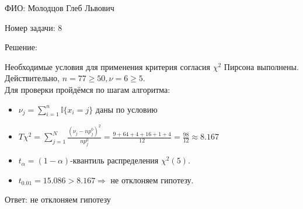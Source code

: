 \documentclass[14pt]{extarticle}
\begin{document}
ФИО: Молодцов Глеб Львович

\vspace{10pt}

Номер задачи: 8

\vspace{10pt}

Решение:

\vspace{10pt}

Необходимые условия для применения критерия согласия $\chi ^2 $ Пирсона выполнены. Действительно, $n = 77 \geq 50, \nu = 6 \geq 5$.\\
Для проверки пройдёмся по шагам алгоритма:\\
\begin{itemize}
    \item $\nu_j = \sum\limits_{i=1}^{n} \mathbb{I}\{x_i = j\} $ даны по условию
    \item $T\chi^2 = \sum\limits_{j=1}^N\frac{(\nu_j - np_j^0)^2}{np_j^0} = \frac{9 + 64 + 4 + 16 + 1 + 4}{12} = \frac{98}{12} \approx 8.167$
    \item $t_\alpha = (1-\alpha) $-квантиль распределения $\chi^2(5) $. \item $t_{0.01} =  15.086 > 8.167 \Rightarrow  $ не отклоняем гипотезу.
\end{itemize}

Ответ: не отклоняем гипотезу
\end{document}
